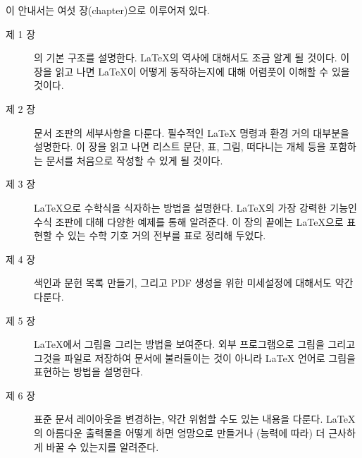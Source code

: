 \bigskip
\noindent 이 안내서는 여섯 장(chapter)으로 이루어져 있다.
\begin{description}
\item[제 1 장] \LaTeXe 의 기본 구조를 설명한다. \LaTeX 의 역사에 대해서도 조금 알게 될 것이다. 이 장을 읽고 나면 \LaTeX 이 어떻게 동작하는지에 대해 어렴풋이 이해할 수 있을 것이다.
\item[제 2 장] 문서 조판의 세부사항을 다룬다. 필수적인 \LaTeX{} 명령과 환경 거의 대부분을 설명한다. 이 장을 읽고 나면 리스트 문단, 표, 그림, 떠다니는 개체 등을 포함하는 문서를 처음으로 작성할 수 있게 될 것이다.
\item[제 3 장] \LaTeX 으로 수학식을 식자하는 방법을 설명한다. \LaTeX 의 가장 강력한 기능인 수식 조판에 대해 다양한 예제를 통해 알려준다. 이 장의 끝에는 \LaTeX 으로 표현할 수 있는 수학 기호 거의 전부를 표로 정리해 두었다.
\item[제 4 장] 색인과 문헌 목록 만들기, 그리고 PDF 생성을 위한 미세설정에 대해서도 약간 다룬다.
\item[제 5 장] \LaTeX 에서 그림을 그리는 방법을 보여준다. 외부 프로그램으로 그림을 그리고 그것을 파일로 저장하여 문서에 불러들이는 것이 아니라 \LaTeX{} 언어로 그림을 표현하는 방법을 설명한다.
\item[제 6 장] 표준 문서 레이아웃을 변경하는, 약간 위험할 수도 있는 내용을 다룬다. \LaTeX 의 아름다운 출력물을 어떻게 하면 엉망으로 만들거나 (능력에 따라) 더 근사하게 바꿀 수 있는지를 알려준다.
\end{description}
